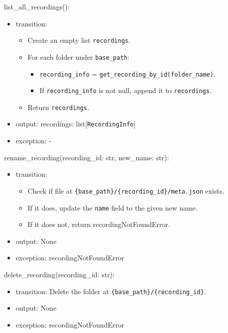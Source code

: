 \documentclass[12pt, titlepage]{article}
\begin{document}
\noindent list\_all\_recordings():
\begin{itemize}
  \item transition:
        \begin{itemize}
          \item Create an empty list \texttt{recordings}.
          \item For each folder under \texttt{base\_path}:
                \begin{itemize}
                  \item \texttt{recording\_info} = \texttt{get\_recording\_by\_id(folder\_name)}.
                  \item If \texttt{recording\_info} is not null, append it to \texttt{recordings}.
                \end{itemize}
          \item Return \texttt{recordings}.
        \end{itemize}
  \item output: recordings: list[\texttt{RecordingInfo}]
  \item exception: -
\end{itemize}

\noindent rename\_recording(recording\_id: str, new\_name: str):
\begin{itemize}
  \item transition:
        \begin{itemize}
          \item Check if file at \texttt{\{base\_path\}/\{recording\_id\}/meta.json} exists.
          \item If it does, update the \texttt{name} field to the given new name.
          \item If it does not, return recordingNotFoundError.
        \end{itemize}
  \item output: None
  \item exception: recordingNotFoundError
\end{itemize}

\noindent delete\_recording(recording\_id: str):
\begin{itemize}
  \item transition: Delete the folder at \texttt{\{base\_path\}/\{recording\_id\}}.
  \item output: None
  \item exception: recordingNotFoundError
\end{itemize}
\end{document}
